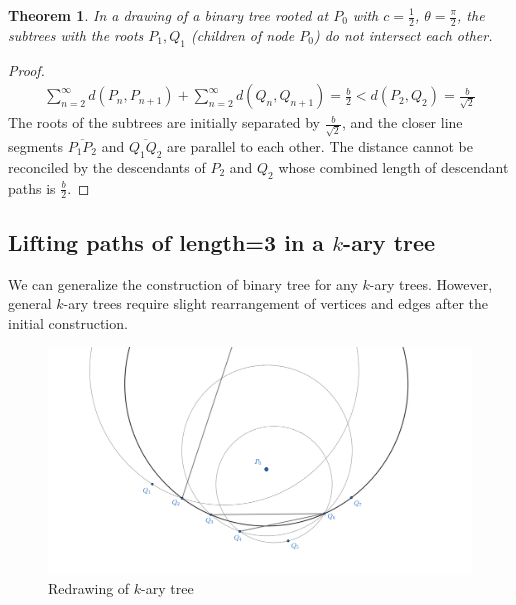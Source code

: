 \documentclass{NSF}
\newtheorem{theorem}{Theorem}[section]
\begin{document}
\begin{theorem}
In a drawing of a binary tree rooted at $P_0$ with $c=\frac{1}{2}$, $\theta=\frac{\pi}{2}$, the subtrees with the roots $P_1,Q_1$ (children of node $P_0$) do not intersect each other.
\label{}
\end{theorem}
\begin{proof}
\begin{align*}
\sum_{n=2}^{\infty} d(P_n,P_{n+1}) + \sum_{n=2}^{\infty} d(Q_n,Q_{n+1}) =\frac{b}{2} < d(P_2,Q_2) = \frac{b}{\sqrt{2}}
\end{align*}
The roots of the subtrees are initially separated by $\frac{b}{\sqrt{2}}$, and the closer line segments $\overline{P_1P_2}$ and $\overline{Q_1Q_2}$ are parallel to each other. The distance cannot be reconciled by the descendants of $P_2$ and $Q_2$ whose combined length of descendant paths is $\frac{b}{2}$.
\end{proof}

\subsection{Lifting paths of length=3 in a \texorpdfstring{$k$}{k}-ary tree}
We can generalize the construction of binary tree for any $k$-ary trees. However, general $k$-ary trees require slight rearrangement of vertices and edges after the initial construction. 
\begin{figure}
\centering
\includegraphics[width=.8\textwidth]{images/proof-k-ary-tree.png}
\caption{Redrawing of $k$-ary tree}
\label{fig:proof-k-ary-tree}
\end{figure}
\end{document}
